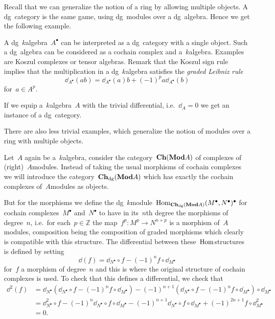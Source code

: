 Recall that we can generalize the notion of a ring by allowing multiple objects. A dg~category is the same game, using dg~modules over a dg~algebra. Hence we get the following example.
\begin{example}
  \label{example:dg-category-of-algebra}
  A dg~$k$\dash algebra~$A^\bullet$ can be interpreted as a dg~category with a single object. Such a dg~algebra can be considered as a cochain complex and a~$k$\dash algebra. Examples are Koszul complexes or tensor algebras. Remark that the Koszul sign rule implies that the multiplication in a dg~$k$\dash algebra satisfies the \emph{graded Leibniz rule}
  \begin{equation}
    \dd_{A^\bullet}(ab)=\dd_{A^\bullet}(a)b+(-1)^pa\dd_{A^\bullet}(b)
  \end{equation}
  for~$a\in A^p$.
  
  If we equip a~$k$\dash algebra~$A$ with the trivial differential, i.e.\ $\dd_A=0$ we get an instance of a dg~category.
\end{example}
There are also less trivial examples, which generalize the notion of modules over a ring with multiple objects.
\begin{example}
  \label{example:Ch-dg(A-mod)}
  Let~$A$ again be a~$k$\dash algebra, consider the category~$\mathbf{Ch}(\mathbf{Mod}{A})$ of complexes of (right)~$A$\dash modules. Instead of taking the usual morphisms of cochain complexes we will introduce the category~$\mathbf{Ch}_{\mathrm{dg}}(\mathbf{Mod}{A})$ which has exactly the cochain complexes of~$A$\dash modules as objects.
  
  But for the morphisms we define the dg~$k$\dash module~$\mathrm{Hom}_{\mathbf{Ch}_{\mathrm{dg}}(\mathbf{Mod}{A})}(M^\bullet,N^\bullet)^\bullet$ for cochain complexes~$M^\bullet$ and~$N^\bullet$ to have in its~$n$th degree the morphisms of degree~$n$, i.e.~for each~$p\in\mathbb{Z}$ the map~$f^p\colon M^p\to N^{n+p}$ is a morphism of~$A$\dash modules, composition being the composition of graded morphisms which clearly is compatible with this structure. The differential between these~$\mathrm{Hom}$\dash structures is defined by setting
  \begin{equation}
    \dd(f)=\dd_{N^\bullet}\circ f-(-1)^nf\circ\dd_{M^\bullet}
  \end{equation}
  for~$f$ a morphism of degree~$n$ and this is where the original structure of cochain complexes is used. To check that this defines a differential, we check that
  \begin{equation}
    \begin{aligned}
      \dd^2(f)&=\dd_{N^\bullet}\left( \dd_{N^\bullet}\circ f-(-1)^nf\circ\dd_{M^\bullet} \right)-(-1)^{n+1}\left( \dd_{N^\bullet}\circ f-(-1)^nf\circ\dd_{M^\bullet} \right)\circ\dd_{M^\bullet} \\
      &=\dd_{N^\bullet}^2\circ f-(-1)^n\dd_{N^\bullet}\circ f\circ\dd_{M^\bullet}-(-1)^{n+1}\dd_{N^\bullet}\circ f\circ\dd_{M^\bullet}+(-1)^{2n+1}f\circ\dd_{M^\bullet}^2 \\
      &=0.
    \end{aligned}
  \end{equation}
\end{example}

